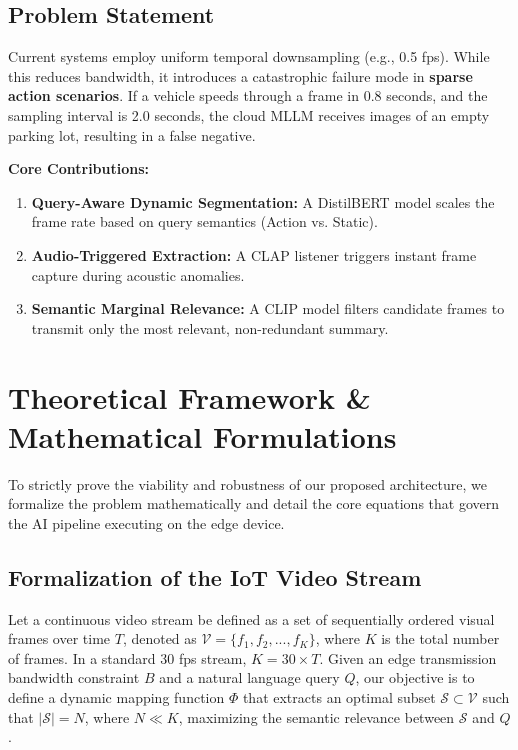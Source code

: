 \documentclass[11pt, a4paper, oneside]{report}
\begin{document}
\section{Problem Statement}
Current systems employ uniform temporal downsampling (e.g., 0.5 fps). While this reduces bandwidth, it introduces a catastrophic failure mode in \textbf{sparse action scenarios}. If a vehicle speeds through a frame in 0.8 seconds, and the sampling interval is 2.0 seconds, the cloud MLLM receives images of an empty parking lot, resulting in a false negative.

\begin{contributionbox}
\textbf{Core Contributions:}
\begin{enumerate}
    \item \textbf{Query-Aware Dynamic Segmentation:} A DistilBERT model scales the frame rate based on query semantics (Action vs. Static).
    \item \textbf{Audio-Triggered Extraction:} A CLAP listener triggers instant frame capture during acoustic anomalies.
    \item \textbf{Semantic Marginal Relevance:} A CLIP model filters candidate frames to transmit only the most relevant, non-redundant summary.
\end{enumerate}
\end{contributionbox}

\chapter{Theoretical Framework \& Mathematical Formulations}

To strictly prove the viability and robustness of our proposed architecture, we formalize the problem mathematically and detail the core equations that govern the AI pipeline executing on the edge device.

\section{Formalization of the IoT Video Stream}
Let a continuous video stream be defined as a set of sequentially ordered visual frames over time $T$, denoted as $\mathcal{V} = \{f_1, f_2, ..., f_K\}$, where $K$ is the total number of frames. In a standard 30 fps stream, $K = 30 \times T$.
Given an edge transmission bandwidth constraint $B$ and a natural language query $Q$, our objective is to define a dynamic mapping function $\Phi$ that extracts an optimal subset $\mathcal{S} \subset \mathcal{V}$ such that $|\mathcal{S}| = N$, where $N \ll K$, maximizing the semantic relevance between $\mathcal{S}$ and $Q$.
\end{document}
